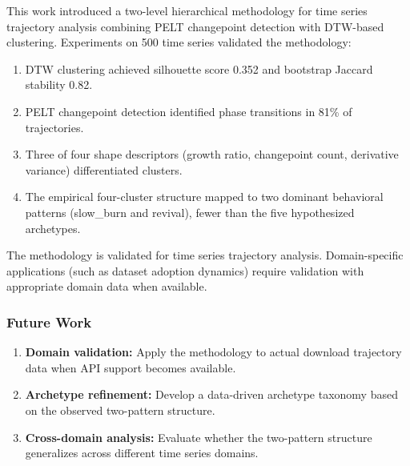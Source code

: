 
This work introduced a two-level hierarchical methodology for time series trajectory analysis combining PELT changepoint detection with DTW-based clustering. Experiments on 500 time series validated the methodology:

\begin{enumerate}
\item DTW clustering achieved silhouette score 0.352 and bootstrap Jaccard stability 0.82.
\item PELT changepoint detection identified phase transitions in 81\% of trajectories.
\item Three of four shape descriptors (growth ratio, changepoint count, derivative variance) differentiated clusters.
\item The empirical four-cluster structure mapped to two dominant behavioral patterns (slow\_burn and revival), fewer than the five hypothesized archetypes.
\end{enumerate}

The methodology is validated for time series trajectory analysis. Domain-specific applications (such as dataset adoption dynamics) require validation with appropriate domain data when available.

\subsubsection{Future Work}

\begin{enumerate}
\item \textbf{Domain validation:} Apply the methodology to actual download trajectory data when API support becomes available.
\item \textbf{Archetype refinement:} Develop a data-driven archetype taxonomy based on the observed two-pattern structure.
\item \textbf{Cross-domain analysis:} Evaluate whether the two-pattern structure generalizes across different time series domains.
\end{enumerate}
